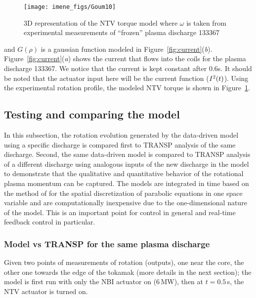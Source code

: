\documentclass[12pt]{iopart}
\begin{document}
\begin{figure}
\centering
\texttt{[image: imene\_figs/Goum10]} %
\caption{3D representation  of the NTV torque model where $\omega$ is taken from experimental measurements of ``frozen'' plasma discharge 133367}
\label{TNTV3D}
\end{figure}

and $G(\rho)$ is a gaussian function modeled in Figure~{\ref{fig:current}}(\emph{b}). Figure~{\ref{fig:current}}(\emph{a}) shows the current that flows into the coils for the plasma discharge  133367. We notice that the current is kept constant after $0.6$s. It should be noted that the actuator input here will be the current function (${I^2}\textrm(t)$). 
Using the experimental rotation profile, the modeled NTV torque is shown in Figure~\ref{TNTV3D}.

\subsection{Testing and comparing the model}

In this subsection, the rotation evolution generated by the data-driven model using a specific discharge is compared first to TRANSP analysis of the same discharge. Second, the same data-driven model is compared to TRANSP analysis of a different discharge using analogous inputs of the new discharge in the model to demonstrate that the qualitative and quantitative behavior of the rotational plasma momentum can be captured.  The models are integrated in time based on the method of \cite{Skeel90} for  the spatial discretization of parabolic equations in one space variable and are computationally inexpensive due to the one-dimensional nature of the model.  This is an important point for control in general and real-time feedback control in particular. 
\subsubsection{Model vs TRANSP for the same plasma discharge}
Given two points of measurements of rotation (outputs), one near the core, the other one towards the edge of the tokamak (more details in the next section); the model is first run with only the NBI actuator on ($6$\,MW), then at $t=0.5$\,s, the NTV actuator is turned on. 
\end{document}
